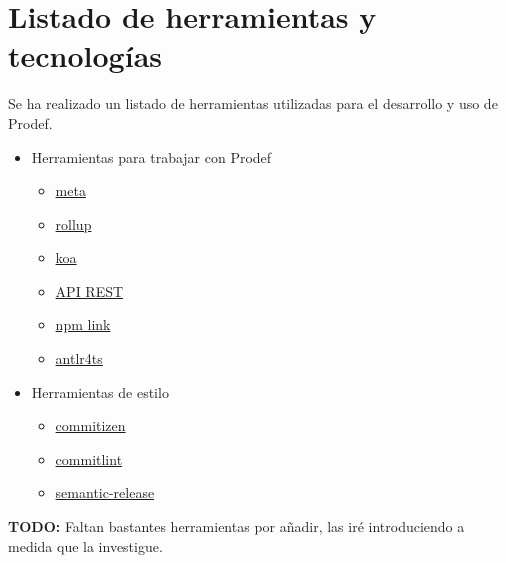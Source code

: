 \section{Listado de herramientas y tecnologías}
Se ha realizado un listado de herramientas utilizadas para el desarrollo y uso de Prodef.
\begin{itemize}
    \item Herramientas para trabajar con Prodef
    \begin{itemize}
        \item \href{https://github.com/mateodelnorte/meta}{meta}
        \item \href{https://www.npmjs.com/package/rollup-plugin-typescript2}{rollup}
        \item \href{https://www.npmjs.com/package/koa}{koa}
        \item \href{https://juanda.gitbooks.io/webapps/content/api/arquitectura-api-rest.html}{API REST}
        \item \href{https://medium.com/dailyjs/how-to-use-npm-link-7375b6219557}{npm link}
        \item \href{https://www.npmjs.com/package/antlr4ts}{antlr4ts}
    \end{itemize}
    \item Herramientas de estilo
    \begin{itemize}
        \item \href{https://github.com/commitizen/cz-cli}{commitizen}
        \item \href{https://www.npmjs.com/package/@commitlint/cli}{commitlint}
        \item \href{https://www.npmjs.com/package/semantic-release}{semantic-release}
    \end{itemize}
\end{itemize}

\textbf{TODO:} Faltan bastantes herramientas por añadir, las iré introduciendo a medida que la investigue.